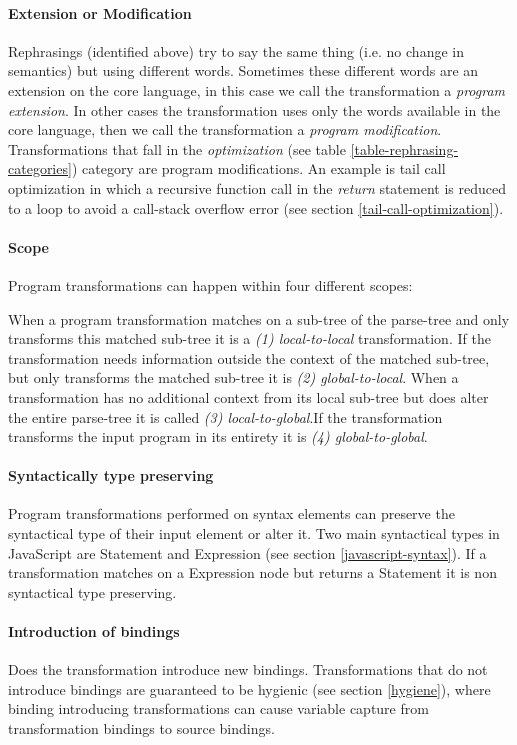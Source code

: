 \paragraph{Extension or Modification}
Rephrasings (identified above) try to say the same thing (i.e. no change in semantics) but using different words\cite{Visser2001}. Sometimes these different words are an extension on the core language, in this case we call the transformation a \textit{program extension}. In other cases the transformation uses only the words available in the core language, then we call the transformation a \textit{program modification}. Transformations that fall in the \textit{optimization} (see table \ref{table-rephrasing-categories}) category are program modifications. An example is tail call optimization in which a recursive function call in the \textit{return} statement is reduced to a loop to avoid a call-stack overflow error (see section \ref{tail-call-optimization}). 

\paragraph{Scope}
Program transformations can happen within four different scopes: 

When a program transformation matches on a sub-tree of the parse-tree and only transforms this matched sub-tree it is a \textit{(1) local-to-local} transformation. If the transformation needs information outside the context of the matched sub-tree, but only transforms the matched sub-tree it is \textit{(2) global-to-local}. When a transformation has no additional context from its local sub-tree but does alter the entire parse-tree it is called \textit{(3) local-to-global}.If the transformation transforms the input program in its entirety it is \textit{(4) global-to-global}.  

\paragraph{Syntactically type preserving}
Program transformations performed on syntax elements can preserve the syntactical type of their input element or alter it. Two main syntactical types in JavaScript are Statement and Expression (see section \ref{javascript-syntax}). If a transformation matches on a Expression node but returns a Statement it is non syntactical type preserving.

\paragraph{Introduction of bindings}
Does the transformation introduce new bindings. Transformations that do not introduce bindings are guaranteed to be hygienic (see section \ref{hygiene}), where binding introducing transformations can cause variable capture from transformation bindings to source bindings.

